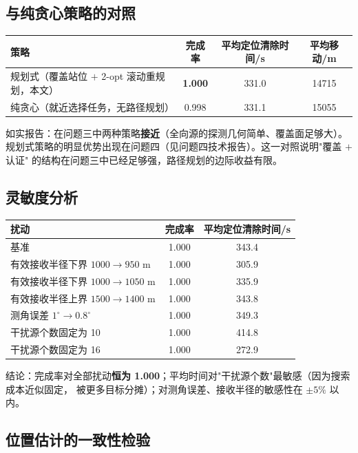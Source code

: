 \subsection{与纯贪心策略的对照}

\begin{center}
\small
\begin{tabular}{p{5.6cm}ccc}
\toprule
策略 & 完成率 & 平均定位清除时间/s & 平均移动/m \\ \midrule
规划式（覆盖站位 $+$ 2-opt 滚动重规划，本文） & \textbf{1.000} & 331.0 & 14715 \\
纯贪心（就近选择任务，无路径规划） & 0.998 & 331.1 & 15055 \\
\bottomrule
\end{tabular}
\end{center}

如实报告：在问题三中两种策略\textbf{接近}（全向源的探测几何简单、覆盖面足够大）。
规划式策略的明显优势出现在问题四（见问题四技术报告）。这一对照说明"覆盖 $+$ 认证"
的结构在问题三中已经足够强，路径规划的边际收益有限。

\subsection{灵敏度分析}

\begin{center}
\begin{tabular}{lcc}
\toprule
扰动 & 完成率 & 平均定位清除时间/s \\ \midrule
基准 & 1.000 & 343.4 \\
有效接收半径下界 $1000\to950$ m & 1.000 & 305.9 \\
有效接收半径下界 $1000\to1050$ m & 1.000 & 335.9 \\
有效接收半径上界 $1500\to1400$ m & 1.000 & 343.8 \\
测角误差 $1^{\circ}\to0.8^{\circ}$ & 1.000 & 349.3 \\
干扰源个数固定为 10 & 1.000 & 414.8 \\
干扰源个数固定为 16 & 1.000 & 272.9 \\
\bottomrule
\end{tabular}
\end{center}

结论：完成率对全部扰动\textbf{恒为 1.000}；平均时间对"干扰源个数"最敏感（因为搜索成本近似固定，
被更多目标分摊）；对测角误差、接收半径的敏感性在 $\pm5\%$ 以内。

\subsection{位置估计的一致性检验}

